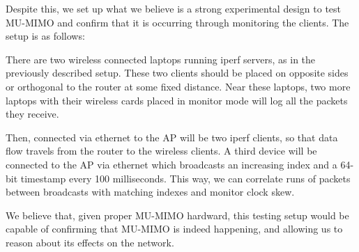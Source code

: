 Despite this, we set up what we believe is a strong experimental design to test
MU-MIMO and confirm that it is occurring through monitoring the clients. The
setup is as follows:

There are two wireless connected laptops running iperf servers, as in the
previously described setup. These two clients should be placed on opposite sides
or orthogonal to the router at some fixed distance. Near these laptops, two more
laptops with their wireless cards placed in monitor mode will log all the
packets they receive.

Then, connected via ethernet to the AP will be two iperf clients, so that data
flow travels from the router to the wireless clients. A third device will be
connected to the AP via ethernet which broadcasts an increasing index and a
64-bit timestamp every 100 milliseconds. This way, we can correlate runs of
packets between broadcasts with matching indexes and monitor clock skew.

We believe that, given proper MU-MIMO hardward, this testing setup would be
capable of confirming that MU-MIMO is indeed happening, and allowing us to
reason about its effects on the network.
